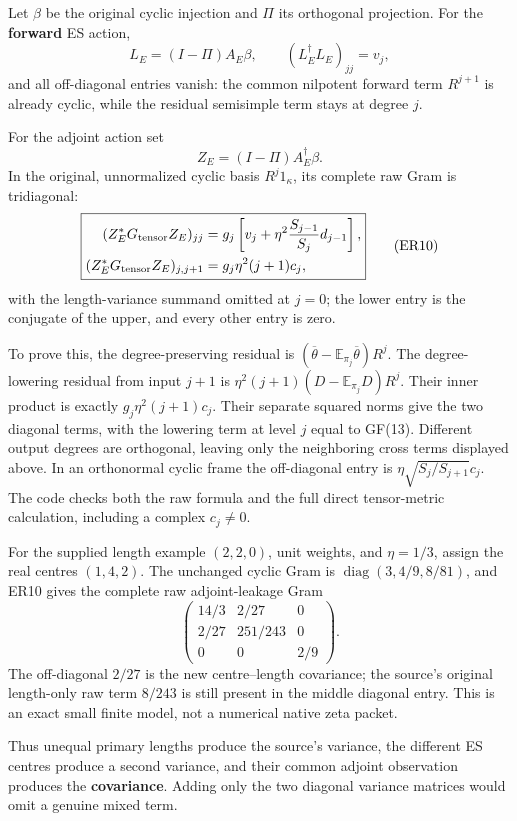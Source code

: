 \documentclass[
  11pt,
]{article}
\begin{document}
Let \(\beta\) be the original cyclic injection and \(\Pi\) its
orthogonal projection. For the \textbf{forward} ES action, \[
L_E=(I-\Pi)A_E\beta,
\qquad (L_E^\dagger L_E)_{jj}=v_j,
\] and all off-diagonal entries vanish: the common nilpotent forward
term \(R^{j+1}\) is already cyclic, while the residual semisimple term
stays at degree \(j\).

For the adjoint action set \[
Z_E=(I-\Pi)A_E^\dagger\beta.
\] In the original, unnormalized cyclic basis \(R^j1_\kappa\), its
complete raw Gram is tridiagonal: \[
\boxed{
\begin{aligned}
(Z_E^*G_{\rm tensor}Z_E)_{jj}
 &=g_j\left[v_j+
 \eta^2\frac{S_{j-1}}{S_j}d_{j-1}\right],\\
(Z_E^*G_{\rm tensor}Z_E)_{j,j+1}
 &=g_j\eta^2(j+1)c_j,
\end{aligned}}
\tag{ER10}
\] with the length-variance summand omitted at \(j=0\); the lower entry
is the conjugate of the upper, and every other entry is zero.

To prove this, the degree-preserving residual is
\((\overline\theta-\mathbb E_{\pi_j}\overline\theta)R^j\). The
degree-lowering residual from input \(j+1\) is
\(\eta^2(j+1)(D-\mathbb E_{\pi_j}D)R^j\). Their inner product is exactly
\(g_j\eta^2(j+1)c_j\). Their separate squared norms give the two
diagonal terms, with the lowering term at level \(j\) equal to GF(13).
Different output degrees are orthogonal, leaving only the neighboring
cross terms displayed above. In an orthonormal cyclic frame the
off-diagonal entry is \(\eta\sqrt{S_j/S_{j+1}}c_j\). The code checks
both the raw formula and the full direct tensor-metric calculation,
including a complex \(c_j\ne0\).

For the supplied length example \((2,2,0)\), unit weights, and
\(\eta=1/3\), assign the real centres \((1,4,2)\). The unchanged cyclic
Gram is \(\operatorname{diag}(3,4/9,8/81)\), and ER10 gives the complete
raw adjoint-leakage Gram \[
\begin{pmatrix}
14/3&2/27&0\\
2/27&251/243&0\\
0&0&2/9
\end{pmatrix}.
\tag{ER10a}
\] The off-diagonal \(2/27\) is the new centre--length covariance; the
source's original length-only raw term \(8/243\) is still present in the
middle diagonal entry. This is an exact small finite model, not a
numerical native zeta packet.

Thus unequal primary lengths produce the source's variance, the
different ES centres produce a second variance, and their common adjoint
observation produces the \textbf{covariance}. Adding only the two
diagonal variance matrices would omit a genuine mixed term.
\end{document}
